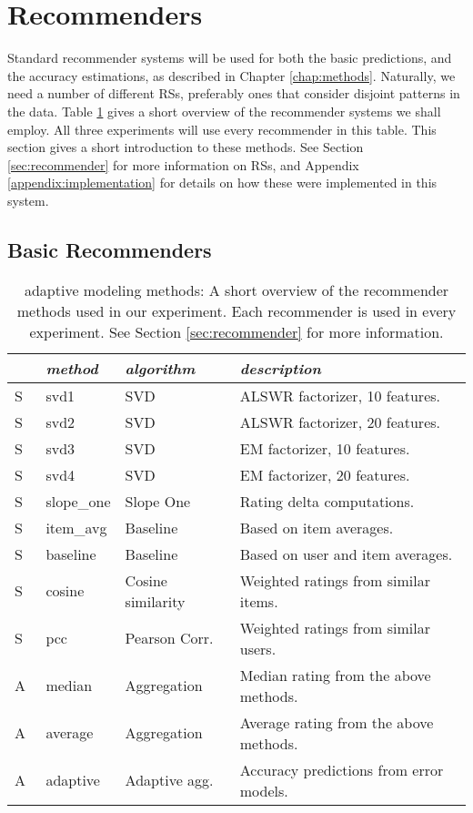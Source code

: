 \section{Recommenders}

Standard recommender systems will be used for both the basic predictions, and the accuracy estimations, as described in Chapter \ref{chap:methods}.
Naturally, we need a number of different RSs, preferably ones that consider
disjoint patterns in the data. Table \ref{table:results:methods}
gives a short overview of the recommender systems we shall employ.
All three experiments will use every recommender in this table.
This section gives a short introduction to these methods.
See Section \ref{sec:recommender} for more information on RSs, 
and Appendix \ref{appendix:implementation} for details on how these were implemented in this system.


\subsection{Basic Recommenders}

\begin{table}[t]
  \begin{tabular*}{\textwidth}{ l l l l }
    \toprule
    ~ & \emph{method} &  \emph{algorithm} & \emph{description} \\
    \midrule
    S & svd1          & SVD                   & ALSWR factorizer, 10 features. \\
    S & svd2          & SVD                   & ALSWR factorizer, 20 features. \\
    S & svd3          & SVD                   & EM factorizer, 10 features. \\
    S & svd4          & SVD                   & EM factorizer, 20 features. \\
    S & slope\_one    & Slope One             & Rating delta computations. \\
    S & item\_avg     & Baseline              & Based on item averages. \\ 
    S & baseline      & Baseline              & Based on user and item averages.\\ 
    S & cosine   	    & Cosine similarity     & Weighted ratings from similar items.\\ 
    S & pcc       	  & Pearson Corr.         & Weighted ratings from similar users.\\
    \midrule
    A & median    	  & Aggregation           & Median rating from the above methods. \\
    A & average    	  & Aggregation           & Average rating from the above methods. \\
    A & adaptive      & Adaptive agg.         & Accuracy predictions from error models. \\
    \bottomrule
  \end{tabular*}
  \caption[adaptive Modeling Methods]{
    adaptive modeling methods: A short overview of the recommender methods
    used in our experiment.
    Each recommender is used in every experiment. 
    See Section \ref{sec:recommender} for more information.
  }
  \label{table:results:methods}
\end{table}

